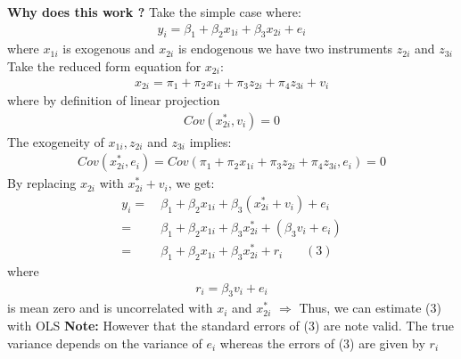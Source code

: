 \documentclass[a4paper,twoside,11pt]{article}
\begin{document}
\textbf{Why does this work ? }
\newline
Take the simple case where:
\begin{equation*}
\begin{aligned}
y_i = \beta_1 + \beta_2 x_{1i} + \beta_3 x_{2i} + e_i
\end{aligned} 
\end{equation*}
where $x_{1i}$ is exogenous and $x_{2i}$ is endogenous
\newline
\newline
we have two instruments $z_{2i}$ and $z_{3i}$
\newline
\newline
Take the reduced form equation for $x_{2i}:$
\begin{equation*}
\begin{aligned}
x_{2i} = \pi_1 + \pi_2 x_{1i} + \pi_3 z_{2i} + \pi_4 z_{3i} + v_i
\end{aligned} 
\end{equation*}
where by definition of linear projection 
\begin{equation*}
\begin{aligned}
Cov(x_{2i}^*, v_i) = 0
\end{aligned} 
\end{equation*}
The exogeneity of $x_{1i}, z_{2i}$ and $z_{3i}$ implies:
\begin{equation*}
\begin{aligned}
Cov(x_{2i}^*,  e_i) = Cov(\pi_1 + \pi_2 x_{1i} + \pi_3 z_{2i} + \pi_4 z_{3i}, e_i) =0
\end{aligned} 
\end{equation*}
By replacing $x_{2i}$ with $x_{2i}^*+v_i$, we get:
\begin{equation*}
\begin{aligned}
y_i =& \ \beta_1 + \beta_2 x_{1i} + \beta_3 (x_{2i}^* + v_i) + e_i \\
=& \ \beta_1 + \beta_2 x_{1i} + \beta_3 x_{2i}^* + (\beta_3 v_i + e_i) \\
=& \ \beta_1 + \beta_2 x_{1i} + \beta_3 x_{2i}^* + r_i \ \ \ \ \ \ \ \ (3)
\end{aligned} 
\end{equation*}
where 
\begin{equation*}
\begin{aligned}
r_i = \beta_3 v_i + e_i
\end{aligned} 
\end{equation*}
is mean zero and is uncorrelated with $x_i$ and $x_{2i}^*$
\newline
$\Rightarrow$ Thus, we can estimate (3) with OLS
\newline
\newline
\textbf{Note:} \textcolor{NavyBlue}{However that the standard errors of (3) are note valid.} The true variance depends on the variance of $e_i$ whereas the errors of (3) are given by $r_i$
\end{document}
